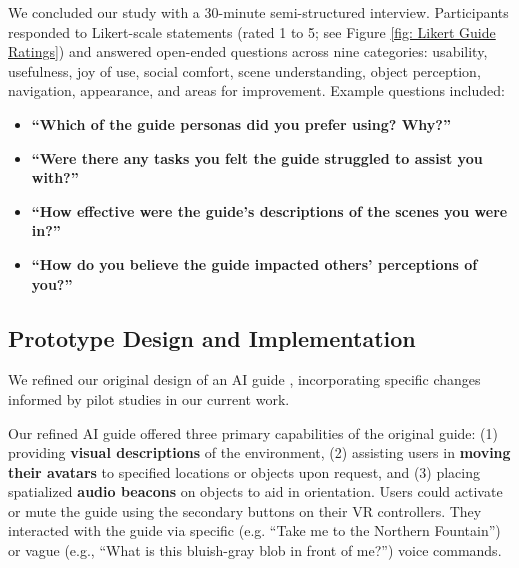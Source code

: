 %

We concluded our study with a 30-minute semi-structured interview. Participants responded to Likert-scale statements (rated 1 to 5; see Figure \ref{fig: Likert Guide Ratings}) and answered open-ended questions across nine categories: usability, usefulness, joy of use, social comfort, scene understanding, object perception, navigation, appearance, and areas for improvement. Example questions included:

\begin{itemize}
	\item \textbf{“Which of the guide personas did you prefer using? Why?”}
	\item \textbf{“Were there any tasks you felt the guide struggled to assist you with?”}
	\item \textbf{“How effective were the guide’s descriptions of the scenes you were in?”}
\item \textbf{“How do you believe the guide impacted others’ perceptions of you?”}
\end{itemize}

\subsection{Prototype Design and Implementation} \label{sec: Prototype Design and Implementation}

We refined our original design of an AI guide \cite{collins2024ai}, incorporating specific changes informed by pilot studies in our current work.

Our refined AI guide offered three primary capabilities of the original guide: (1) providing \textbf{visual descriptions} of the environment, (2) assisting users in \textbf{moving their avatars} to specified locations or objects upon request, and (3) placing spatialized \textbf{audio beacons} on objects to aid in orientation. Users could activate or mute the guide using the secondary buttons on their VR controllers. They interacted with the guide via specific (e.g. “Take me to the Northern Fountain”) or vague (e.g., “What is this bluish-gray blob in front of me?”) voice commands.



